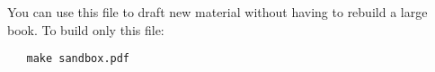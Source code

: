 

You can use this file to draft new material without having to rebuild a large book. To build only this file:

\begin{verbatim}
   make sandbox.pdf
\end{verbatim}


